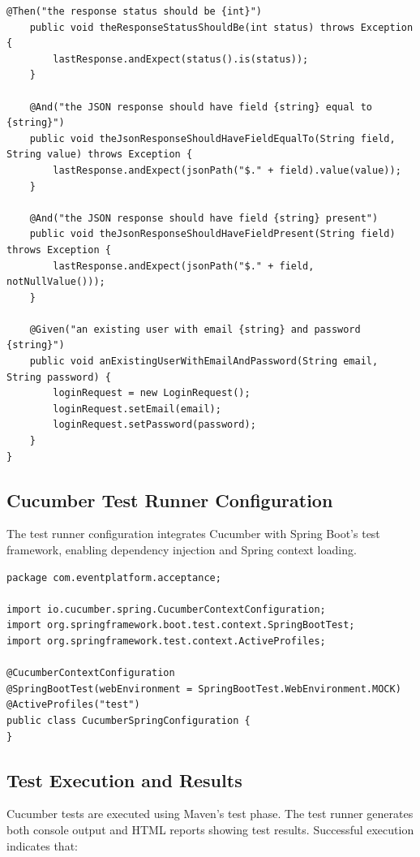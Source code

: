 \documentclass[12pt,a4paper]{article}
\begin{document}
\begin{lstlisting}[style=java, caption={Auth Step Definitions (Partial)}, label={lst:step-definitions}]
    @Then("the response status should be {int}")
    public void theResponseStatusShouldBe(int status) throws Exception {
        lastResponse.andExpect(status().is(status));
    }

    @And("the JSON response should have field {string} equal to {string}")
    public void theJsonResponseShouldHaveFieldEqualTo(String field, String value) throws Exception {
        lastResponse.andExpect(jsonPath("$." + field).value(value));
    }

    @And("the JSON response should have field {string} present")
    public void theJsonResponseShouldHaveFieldPresent(String field) throws Exception {
        lastResponse.andExpect(jsonPath("$." + field, notNullValue()));
    }

    @Given("an existing user with email {string} and password {string}")
    public void anExistingUserWithEmailAndPassword(String email, String password) {
        loginRequest = new LoginRequest();
        loginRequest.setEmail(email);
        loginRequest.setPassword(password);
    }
}
\end{lstlisting}

\subsection{Cucumber Test Runner Configuration}

The test runner configuration integrates Cucumber with Spring Boot's test framework, enabling dependency injection and Spring context loading.

\begin{lstlisting}[style=java, caption={Cucumber Spring Configuration}, label={lst:cucumber-config}]
package com.eventplatform.acceptance;

import io.cucumber.spring.CucumberContextConfiguration;
import org.springframework.boot.test.context.SpringBootTest;
import org.springframework.test.context.ActiveProfiles;

@CucumberContextConfiguration
@SpringBootTest(webEnvironment = SpringBootTest.WebEnvironment.MOCK)
@ActiveProfiles("test")
public class CucumberSpringConfiguration {
}
\end{lstlisting}

\subsection{Test Execution and Results}

Cucumber tests are executed using Maven's test phase. The test runner generates both console output and HTML reports showing test results. Successful execution indicates that:
\end{document}
